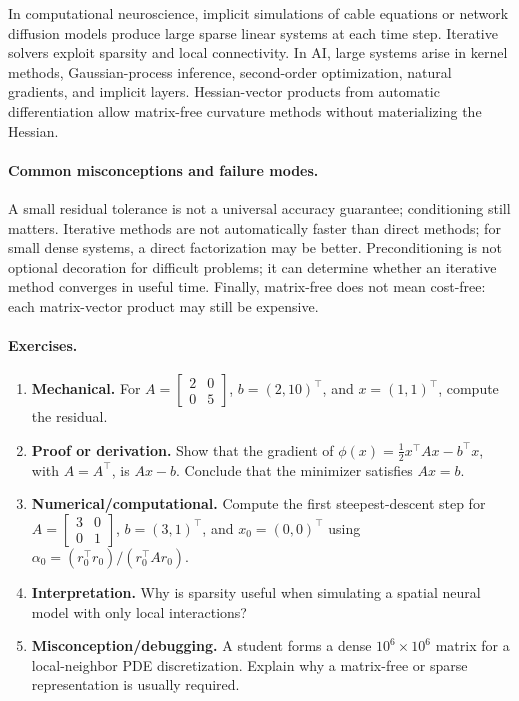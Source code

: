 In computational neuroscience, implicit simulations of cable equations or network diffusion models produce large sparse linear systems at each time step. Iterative solvers exploit sparsity and local connectivity. In AI, large systems arise in kernel methods, Gaussian-process inference, second-order optimization, natural gradients, and implicit layers. Hessian-vector products from automatic differentiation allow matrix-free curvature methods without materializing the Hessian.

\paragraph{Common misconceptions and failure modes.}
A small residual tolerance is not a universal accuracy guarantee; conditioning still matters. Iterative methods are not automatically faster than direct methods; for small dense systems, a direct factorization may be better. Preconditioning is not optional decoration for difficult problems; it can determine whether an iterative method converges in useful time. Finally, matrix-free does not mean cost-free: each matrix-vector product may still be expensive.

\paragraph{Exercises.}
\begin{enumerate}[label=\textbf{24.3.\arabic*.}, leftmargin=*]
\item \textbf{Mechanical.} For \(A=\begin{bmatrix}2&0\\0&5\end{bmatrix}\), \(b=(2,10)^\top\), and \(x=(1,1)^\top\), compute the residual.
\item \textbf{Proof or derivation.} Show that the gradient of \(\phi(x)=\frac12x^\top Ax-b^\top x\), with \(A=A^\top\), is \(Ax-b\). Conclude that the minimizer satisfies \(Ax=b\).
\item \textbf{Numerical/computational.} Compute the first steepest-descent step for \(A=\begin{bmatrix}3&0\\0&1\end{bmatrix}\), \(b=(3,1)^\top\), and \(x_0=(0,0)^\top\) using \(\alpha_0=(r_0^\top r_0)/(r_0^\top A r_0)\).
\item \textbf{Interpretation.} Why is sparsity useful when simulating a spatial neural model with only local interactions?
\item \textbf{Misconception/debugging.} A student forms a dense \(10^6\times 10^6\) matrix for a local-neighbor PDE discretization. Explain why a matrix-free or sparse representation is usually required.
\end{enumerate}

